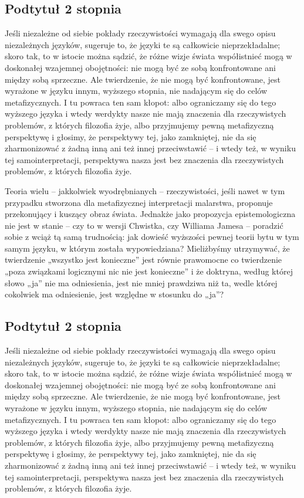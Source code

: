 \subsection{Podtytuł 2 stopnia}

\noindent Jeśli niezależne od siebie pokłady rzeczywistości wymagają dla swego opisu niezależnych języków, sugeruje to, że języki te są całkowicie nieprzekładalne; skoro tak, to w istocie można sądzić, że różne wizje świata współistnieć mogą w doskonałej wzajemnej obojętności: nie mogą być ze sobą konfrontowane ani między sobą sprzeczne. Ale twierdzenie, że nie mogą być konfrontowane, jest wyrażone w języku innym, wyższego stopnia, nie nadającym się do celów metafizycznych. I tu powraca ten sam kłopot: albo ograniczamy się do tego wyższego języka i wtedy werdykty nasze nie mają znaczenia dla rzeczywistych problemów, z których filozofia żyje, albo przyjmujemy pewną metafizyczną perspektywę i głosimy, że perspektywy tej, jako zamkniętej, nie da się zharmonizować z żadną inną ani też innej przeciwstawić -- i wtedy też, w wyniku tej samointerpretacji, perspektywa nasza jest bez znaczenia dla rzeczywistych problemów, z których filozofia żyje.


\noindent Teoria wielu -- jakkolwiek wyodrębnianych -- rzeczywistości, jeśli nawet w tym przypadku stworzona dla metafizycznej interpretacji malarstwa, proponuje przekonujący i kuszący obraz świata. Jednakże jako propozycja epistemologiczna nie jest w stanie -- czy to w wersji Chwistka, czy Williama Jamesa -- poradzić sobie z wciąż tą samą trudnością: jak dowieść wyższości pewnej teorii bytu w tym samym języku, w którym została wypowiedziana? Mieliżbyśmy utrzymywać, że twierdzenie „wszystko jest konieczne” jest równie prawomocne co twierdzenie „poza związkami logicznymi nic nie jest konieczne” i że doktryna, według której słowo „ja” nie ma odniesienia, jest nie mniej prawdziwa niż ta, wedle której cokolwiek ma odniesienie, jest względne w stosunku do „ja”?

\subsection{Podtytuł 2 stopnia}

\noindent Jeśli niezależne od siebie pokłady rzeczywistości wymagają dla swego opisu niezależnych języków, sugeruje to, że języki te są całkowicie nieprzekładalne; skoro tak, to w istocie można sądzić, że różne wizje świata współistnieć mogą w doskonałej wzajemnej obojętności: nie mogą być ze sobą konfrontowane ani między sobą sprzeczne. Ale twierdzenie, że nie mogą być konfrontowane, jest wyrażone w języku innym, wyższego stopnia, nie nadającym się do celów metafizycznych. I tu powraca ten sam kłopot: albo ograniczamy się do tego wyższego języka i wtedy werdykty nasze nie mają znaczenia dla rzeczywistych problemów, z których filozofia żyje, albo przyjmujemy pewną metafizyczną perspektywę i głosimy, że perspektywy tej, jako zamkniętej, nie da się zharmonizować z żadną inną ani też innej przeciwstawić -- i wtedy też, w wyniku tej samointerpretacji, perspektywa nasza jest bez znaczenia dla rzeczywistych problemów, z których filozofia żyje.

